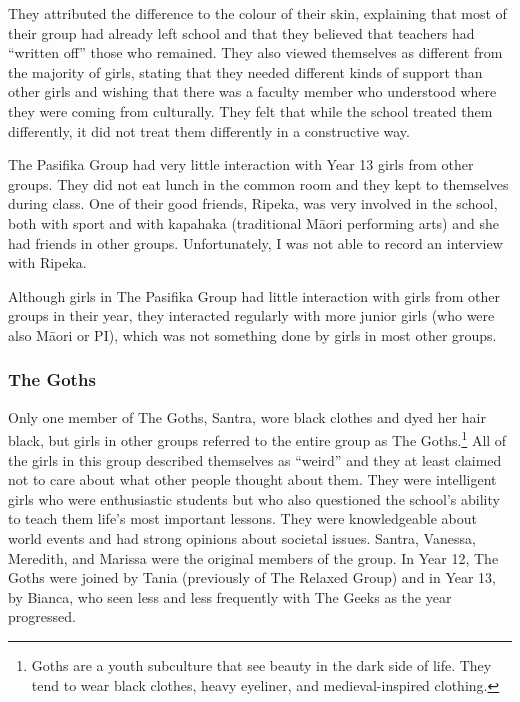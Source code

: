 \vspace{5 mm}

\noindent They attributed the difference to the colour of their skin, explaining that most of their group had already left school and that they believed that teachers had ``written off'' those who remained. They also viewed themselves as different from the majority of girls, stating that they needed different kinds of support than other girls and wishing that there was a faculty member who understood where they were coming from culturally. They felt that while the school treated them differently, it did not treat them differently in a constructive way.



The Pasifika Group had very little interaction with Year 13 girls from other groups. They did not eat lunch in the common room and they kept to themselves during class. One of their good friends, Ripeka, was very involved in the school, both with sport and with kapahaka (traditional M\=aori performing arts) and she had friends in other groups. Unfortunately, I was not able to record an interview with Ripeka.

Although girls in The Pasifika Group had little interaction with girls from other groups in their year, they interacted regularly with more junior girls (who were also M\=aori or PI), which was not something done by girls in most other groups. 

\subsubsection{The Goths}

Only one member of The Goths, Santra, wore black clothes and dyed her hair black, but girls in other groups referred to the entire group as The Goths.\footnote{Goths are a youth subculture that see beauty in the dark side of life. They tend to wear black clothes, heavy eyeliner, and medieval-inspired clothing.}  All of the girls in this group described themselves as ``weird'' and they at least claimed not to care about what other people thought about them. They were intelligent girls who were enthusiastic students but who also questioned the school's ability to teach them life's most important lessons. They were knowledgeable about world events and had strong opinions about societal issues. Santra, Vanessa, Meredith, and Marissa were the original members of the group. In Year 12, The Goths were joined by Tania (previously of The Relaxed Group) and in Year 13, by Bianca, who seen less and less frequently with The Geeks as the year progressed.

